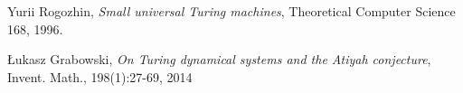 \begin{thebibliography}{1}

	Yurii Rogozhin,
	\emph{Small universal Turing machines},
	Theoretical Computer Science 168,
	1996.

	\L{}ukasz Grabowski,
	\emph{On Turing dynamical systems and the Atiyah conjecture},
	Invent. Math., 198(1):27-69,
	2014

\end{thebibliography}
